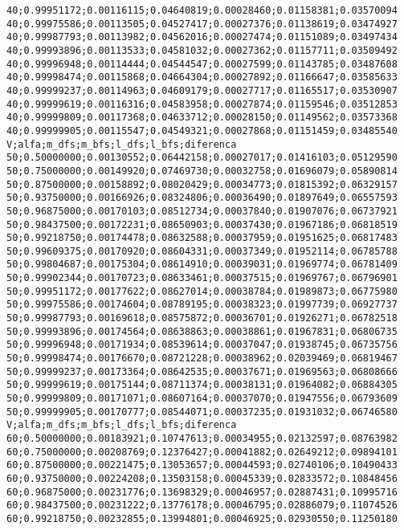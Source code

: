 \documentclass[brazil,times]{abnt}
\begin{document}
{\begin{verbatim}
40;0.99951172;0.00116115;0.04640819;0.00028460;0.01158381;0.03570094
40;0.99975586;0.00113505;0.04527417;0.00027376;0.01138619;0.03474927
40;0.99987793;0.00113982;0.04562016;0.00027474;0.01151089;0.03497434
40;0.99993896;0.00113533;0.04581032;0.00027362;0.01157711;0.03509492
40;0.99996948;0.00114444;0.04544547;0.00027599;0.01143785;0.03487608
40;0.99998474;0.00115868;0.04664304;0.00027892;0.01166647;0.03585633
40;0.99999237;0.00114963;0.04609179;0.00027717;0.01165517;0.03530907
40;0.99999619;0.00116316;0.04583958;0.00027874;0.01159546;0.03512853
40;0.99999809;0.00117368;0.04633712;0.00028150;0.01149562;0.03573368
40;0.99999905;0.00115547;0.04549321;0.00027868;0.01151459;0.03485540
V;alfa;m_dfs;m_bfs;l_dfs;l_bfs;diferenca
50;0.50000000;0.00130552;0.06442158;0.00027017;0.01416103;0.05129590
50;0.75000000;0.00149920;0.07469730;0.00032758;0.01696079;0.05890814
50;0.87500000;0.00158892;0.08020429;0.00034773;0.01815392;0.06329157
50;0.93750000;0.00166926;0.08324806;0.00036490;0.01897649;0.06557593
50;0.96875000;0.00170103;0.08512734;0.00037840;0.01907076;0.06737921
50;0.98437500;0.00172231;0.08650903;0.00037430;0.01967186;0.06818519
50;0.99218750;0.00174478;0.08632588;0.00037959;0.01951625;0.06817483
50;0.99609375;0.00170920;0.08604331;0.00037349;0.01952114;0.06785788
50;0.99804687;0.00175304;0.08614910;0.00039031;0.01969774;0.06781409
50;0.99902344;0.00170723;0.08633461;0.00037515;0.01969767;0.06796901
50;0.99951172;0.00177622;0.08627014;0.00038784;0.01989873;0.06775980
50;0.99975586;0.00174604;0.08789195;0.00038323;0.01997739;0.06927737
50;0.99987793;0.00169618;0.08575872;0.00036701;0.01926271;0.06782518
50;0.99993896;0.00174564;0.08638863;0.00038861;0.01967831;0.06806735
50;0.99996948;0.00171934;0.08539614;0.00037047;0.01938745;0.06735756
50;0.99998474;0.00176670;0.08721228;0.00038962;0.02039469;0.06819467
50;0.99999237;0.00173364;0.08642535;0.00037671;0.01969563;0.06808666
50;0.99999619;0.00175144;0.08711374;0.00038131;0.01964082;0.06884305
50;0.99999809;0.00171071;0.08607164;0.00037070;0.01947556;0.06793609
50;0.99999905;0.00170777;0.08544071;0.00037235;0.01931032;0.06746580
V;alfa;m_dfs;m_bfs;l_dfs;l_bfs;diferenca
60;0.50000000;0.00183921;0.10747613;0.00034955;0.02132597;0.08763982
60;0.75000000;0.00208769;0.12376427;0.00041882;0.02649212;0.09894101
60;0.87500000;0.00221475;0.13053657;0.00044593;0.02740106;0.10490433
60;0.93750000;0.00224208;0.13503158;0.00045339;0.02833572;0.10848456
60;0.96875000;0.00231776;0.13698329;0.00046957;0.02887431;0.10995716
60;0.98437500;0.00231222;0.13776178;0.00046795;0.02886079;0.11074526
60;0.99218750;0.00232855;0.13994801;0.00046925;0.02930550;0.11250180

\end{verbatim}}
\end{document}
